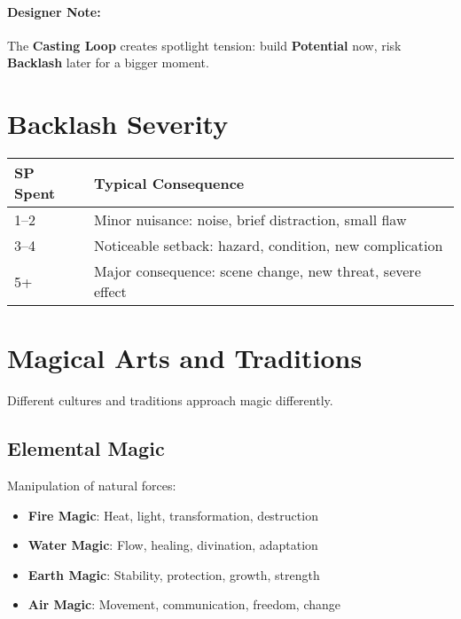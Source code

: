 \begin{multicols}{2}
\paragraph{Designer Note:}
The \textbf{Casting Loop} creates spotlight tension: build \textbf{Potential} now, risk \textbf{Backlash} later for a bigger moment.

\section{Backlash Severity} 

\begin{center}
\small
\begin{tabular}{ll}
\toprule
\textbf{SP Spent} & \textbf{Typical Consequence} \\
\midrule
1--2 & Minor nuisance: noise, brief distraction, small flaw \\
3--4 & Noticeable setback: hazard, condition, new complication \\
5+   & Major consequence: scene change, new threat, severe effect \\
\bottomrule
\end{tabular}
\end{center}

\section{Magical Arts and Traditions} 

Different cultures and traditions approach magic differently.

\subsection*{Elemental Magic} 
Manipulation of natural forces:
\begin{itemize}
\item \textbf{Fire Magic}: Heat, light, transformation, destruction
\item \textbf{Water Magic}: Flow, healing, divination, adaptation
\item \textbf{Earth Magic}: Stability, protection, growth, strength
\item \textbf{Air Magic}: Movement, communication, freedom, change
\end{itemize}


\end{multicols}

